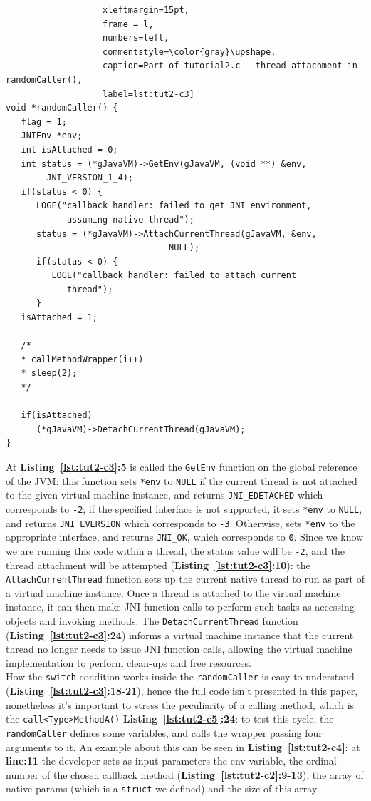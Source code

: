 \documentclass[a4paper,10pt]{article}
\newcommand{\keyword}[1]{\texttt{#1}}
\newcommand{\refl}[1]{\textbf{Listing~\ref{#1}}}
\begin{document}
\begin{multicols}{2}
\begin{lstlisting}
				   xleftmargin=15pt,
				   frame = l,
				   numbers=left,
				   commentstyle=\color{gray}\upshape,
				   caption=Part of tutorial2.c - thread attachment in randomCaller(),
				   label=lst:tut2-c3]
void *randomCaller() {
   flag = 1;
   JNIEnv *env;
   int isAttached = 0;				   
   int status = (*gJavaVM)->GetEnv(gJavaVM, (void **) &env,
		JNI_VERSION_1_4);
   if(status < 0) {
      LOGE("callback_handler: failed to get JNI environment,
      		assuming native thread");
      status = (*gJavaVM)->AttachCurrentThread(gJavaVM, &env,
      							NULL);
      if(status < 0) {
         LOGE("callback_handler: failed to attach current
         	thread");
      }
   isAttached = 1;

   /*
   * callMethodWrapper(i++) 
   * sleep(2);   
   */
   
   if(isAttached)
      (*gJavaVM)->DetachCurrentThread(gJavaVM);
}
\end{lstlisting}
At \refl{lst:tut2-c3}\textbf{:5} is called the \keyword{GetEnv} function on the global reference of the JVM: this function sets \keyword{*env} to \keyword{NULL} if the current thread is not attached to the given virtual machine instance, and returns \keyword{JNI\_EDETACHED} which corresponds to \keyword{-2}; if the specified interface is not supported, it sets \keyword{*env} to \keyword{NULL}, and returns \keyword{JNI\_EVERSION} which corresponds to \keyword{-3}. Otherwise, sets \keyword{*env} to the appropriate interface, and returns \keyword{JNI\_OK}, which corresponds to \keyword{0}. Since we know we are running this code within a thread, the status value will be \keyword{-2}, and the thread attachment will be attempted (\refl{lst:tut2-c3}\textbf{:10}): the \keyword{AttachCurrentThread} function sets up the current native thread to run as part of a virtual machine instance. Once a thread is attached to the virtual machine instance, it can then make JNI function calls to perform such tasks as accessing objects and invoking methods. The \keyword{DetachCurrentThread} function (\refl{lst:tut2-c3}\textbf{:24}) informs a virtual machine instance that the current thread no longer needs to issue JNI function calls, allowing the virtual machine implementation to perform clean-ups and free resources.\\
How the \keyword{switch} condition works inside the \keyword{randomCaller} is easy to understand (\refl{lst:tut2-c3}\textbf{:18-21}), hence the full code isn't presented in this paper, nonetheless it's important to stress the peculiarity of a calling method, which is the \keyword{call<Type>MethodA()} \refl{lst:tut2-c5}\textbf{:24}: to test this cycle, the \keyword{randomCaller} defines some variables, and calls the wrapper passing four arguments to it. An example about this can be seen in \refl{lst:tut2-c4}: at \textbf{line:11} the developer sets as input parameters the env variable, the ordinal number of the chosen callback method (\refl{lst:tut2-c2}\textbf{:9-13}), the array of native params (which is a \keyword{struct} we defined) and the size of this array.

\end{multicols}
\end{document}
